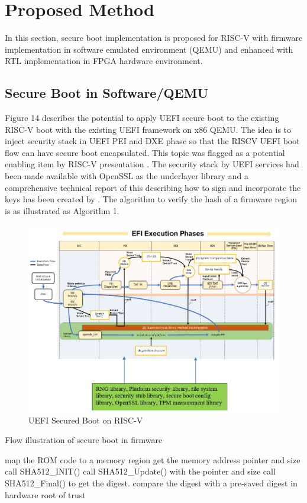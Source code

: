 \documentclass[]{rsos}%
\begin{document}
\section{ Proposed Method}
In this section, secure boot implementation is proposed for RISC-V with firmware implementation in software emulated environment (QEMU) and enhanced with RTL implementation in FPGA hardware environment.


\subsection{ Secure Boot in Software/QEMU}
Figure 14 describes the potential to apply UEFI secure boot to the existing RISC-V boot with the existing UEFI framework on x86 QEMU. The idea is to inject security stack in UEFI PEI and DXE phase so that the RISCV UEFI boot flow can have secure boot encapsulated. This topic was flagged as a potential enabling item by RISC-V presentation \cite{R5:10}. The security stack by UEFI services had been made available with OpenSSL as the underlayer library and a comprehensive technical report of this describing how to sign and incorporate the keys has been created by \cite{R5:11}. The algorithm to verify the hash of a firmware region is as illustrated as Algorithm 1.


\begin{figure}[hbt!]
	\centering
	\includegraphics[width=1\textwidth]{figs/SecureBootOnRISCV.JPG}
	\caption{UEFI Secured Boot on RISC-V}
\end{figure}

\begin{algorithm}
 \caption{Flow illustration of secure boot in firmware}
map the ROM code to a memory region\;
get the memory address pointer and size\;
call SHA512\_INIT()\;
call SHA512\_Update() with the pointer and size\;
call SHA512\_Final() to get the digest.\;
compare the digest with a pre-saved digest in hardware root of trust\;


\end{algorithm}
\end{document}
